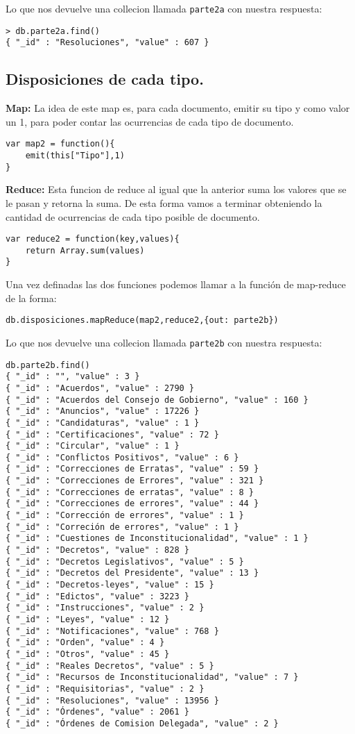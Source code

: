 Lo que nos devuelve una collecion llamada \texttt{parte2a} con nuestra respuesta:

\begin{lstlisting}
> db.parte2a.find()
{ "_id" : "Resoluciones", "value" : 607 }
\end{lstlisting}

\subsection{Disposiciones de cada tipo.}
\textbf{Map:}
La idea de este map es, para cada documento, emitir su tipo y como valor un 1, para poder contar las ocurrencias
de cada tipo de documento.

\begin{lstlisting}
var map2 = function(){
	emit(this["Tipo"],1)
}
\end{lstlisting}

\textbf{Reduce:}
Esta funcion de reduce al igual que la anterior suma los valores que se le pasan y retorna la suma. De esta forma vamos a terminar
obteniendo la cantidad de ocurrencias de cada tipo posible de documento.
\begin{lstlisting}
var reduce2 = function(key,values){
	return Array.sum(values)
}
\end{lstlisting}

Una vez definadas las dos funciones podemos llamar a la función de map-reduce de la forma:
\begin{lstlisting}
db.disposiciones.mapReduce(map2,reduce2,{out: parte2b})
\end{lstlisting}

Lo que nos devuelve una collecion llamada \texttt{parte2b} con nuestra respuesta:

\begin{lstlisting}
db.parte2b.find()
{ "_id" : "", "value" : 3 }
{ "_id" : "Acuerdos", "value" : 2790 }
{ "_id" : "Acuerdos del Consejo de Gobierno", "value" : 160 }
{ "_id" : "Anuncios", "value" : 17226 }
{ "_id" : "Candidaturas", "value" : 1 }
{ "_id" : "Certificaciones", "value" : 72 }
{ "_id" : "Circular", "value" : 1 }
{ "_id" : "Conflictos Positivos", "value" : 6 }
{ "_id" : "Correcciones de Erratas", "value" : 59 }
{ "_id" : "Correcciones de Errores", "value" : 321 }
{ "_id" : "Correcciones de erratas", "value" : 8 }
{ "_id" : "Correcciones de errores", "value" : 44 }
{ "_id" : "Corrección de errores", "value" : 1 }
{ "_id" : "Correción de errores", "value" : 1 }
{ "_id" : "Cuestiones de Inconstitucionalidad", "value" : 1 }
{ "_id" : "Decretos", "value" : 828 }
{ "_id" : "Decretos Legislativos", "value" : 5 }
{ "_id" : "Decretos del Presidente", "value" : 13 }
{ "_id" : "Decretos-leyes", "value" : 15 }
{ "_id" : "Edictos", "value" : 3223 }
{ "_id" : "Instrucciones", "value" : 2 }
{ "_id" : "Leyes", "value" : 12 }
{ "_id" : "Notificaciones", "value" : 768 }
{ "_id" : "Orden", "value" : 4 }
{ "_id" : "Otros", "value" : 45 }
{ "_id" : "Reales Decretos", "value" : 5 }
{ "_id" : "Recursos de Inconstitucionalidad", "value" : 7 }
{ "_id" : "Requisitorias", "value" : 2 }
{ "_id" : "Resoluciones", "value" : 13956 }
{ "_id" : "Órdenes", "value" : 2061 }
{ "_id" : "Órdenes de Comision Delegada", "value" : 2 }
\end{lstlisting}

